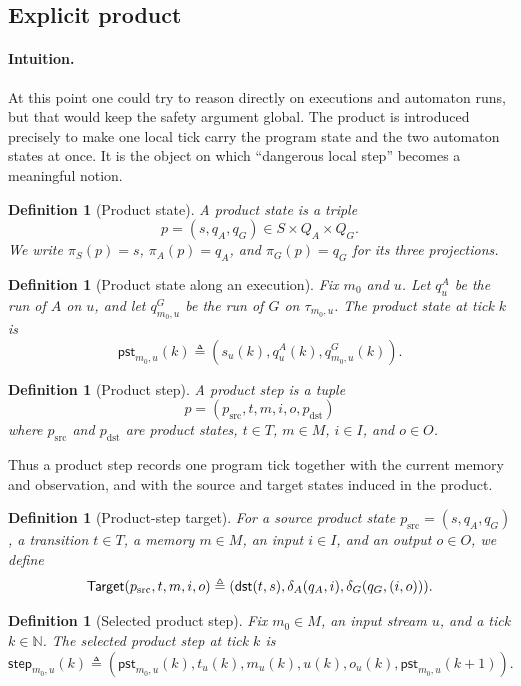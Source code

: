 \documentclass[acmsmall,screen]{acmart}
\theoremstyle{leftplain}
\theoremstyle{leftdefinition}
\newtheorem{definition}[theorem]{Definition}
\theoremstyle{leftremark}
\begin{document}
\subsection{Explicit product}
\paragraph{Intuition.}
At this point one could try to reason directly on executions and automaton runs,
but that would keep the safety argument global. The product is introduced
precisely to make one local tick carry the program state and the two automaton
states at once. It is the object on which ``dangerous local step'' becomes a
 meaningful notion.

\begin{definition}[Product state]
A product state is a triple
\[
  p=(s,q_A,q_G)\in S \times Q_A \times Q_G.
\]
We write $\pi_S(p)=s$, $\pi_A(p)=q_A$, and $\pi_G(p)=q_G$ for its three
projections.
\end{definition}

\begin{definition}[Product state along an execution]
Fix $m_0$ and $u$. Let $q^A_u$ be the run of $A$ on $u$, and let $q^G_{m_0,u}$
be the run of $G$ on $\tau_{m_0,u}$. The product state at tick $k$ is
\[
  \mathsf{pst}_{m_0,u}(k) \triangleq
  (s_u(k), q^A_u(k), q^G_{m_0,u}(k)).
\]
\end{definition}

\begin{definition}[Product step]
A product step is a tuple
\[
  p = (p_{\mathrm{src}}, t, m, i, o, p_{\mathrm{dst}})
\]
where $p_{\mathrm{src}}$ and $p_{\mathrm{dst}}$ are product states,
$t \in T$, $m \in M$, $i \in I$, and $o \in O$.
\end{definition}

Thus a product step records one program tick together with the current memory
and observation, and with the source and target states induced in the product.

\begin{definition}[Product-step target]
For a source product state $p_{\mathrm{src}}=(s,q_A,q_G)$, a transition
$t \in T$, a memory $m \in M$, an input $i \in I$, and an output $o \in O$, we
define
\[
  \mathsf{Target}(p_{\mathrm{src}},t,m,i,o)
  \triangleq
  (\mathsf{dst}(t,s), \delta_A(q_A,i), \delta_G(q_G,(i,o))).
\]
\end{definition}

\begin{definition}[Selected product step]
Fix $m_0 \in M$, an input stream $u$, and a tick $k \in \mathbb{N}$. The
selected product step at tick $k$ is
\[
  \mathsf{step}_{m_0,u}(k) \triangleq
  (\mathsf{pst}_{m_0,u}(k), t_u(k), m_u(k), u(k), o_u(k), \mathsf{pst}_{m_0,u}(k+1)).
\]
\end{definition}
\end{document}
